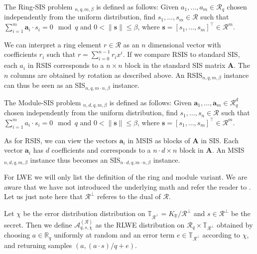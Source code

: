 
\begin{definition}
    The Ring-SIS problem $_{n, q, m, \beta}$ is defined as follows: Given $a_1, \ldots, a_m \in \mathcal{R}_q$ chosen independently from the uniform distribution, find $s_1, \ldots, s_m \in \mathcal{R}$ such that $\sum_{i=1}^m \mathbf{a}_i \cdot s_i = 0 \mod q$ and $0 < \| \mathbf{s}\| \leq \beta$, where $\mathbf{s} = \left[s_1, \ldots, s_m\right]^\intercal \in \mathcal{R}^m$.
\end{definition} %
We can interpret a ring element $r \in \mathcal{R}$ as an $n$ dimensional vector with coefficients $r_i$ such that $r = \sum_{i=0}^{n-1} r_i x^i$. If we compare RSIS to standard SIS, each $a_i$ in RSIS corresponds to a $n\times n$ block in the standard SIS matrix $\mathbf{A}$. The $n$ columns are obtained by rotation as described above. An RSIS$_{n, q, m, \beta}$ instance can thus be seen as an SIS$_{n, q, m \cdot n, \beta}$ instance.

\begin{definition}
    The Module-SIS problem $_{n, d, q, m, \beta}$ is defined as follows: Given  $\mathbf{a}_1, \ldots, \mathbf{a}_m \in \mathcal{R}_q^d$ chosen independently from the uniform distribution, find $s_1, \ldots, s_n \in \mathcal{R}$ such that $\sum_{i=1}^m a_i \cdot s_i = 0\mod q$ and $0 < \| \mathbf{s}\| \leq \beta$, where $\mathbf{s} = \left[s_1, \ldots, s_m\right]^\intercal \in \mathcal{R}^m$.
\end{definition} %
As for RSIS, we can view the vectors $\mathbf{a}_i$ in MSIS as blocks of $\mathbf{A}$ in SIS. Each vector $\mathbf{a}_i$ has $d$ coefficients and corresponds to a $n\cdot d \times n$ block in $\mathbf{A}$. An MSIS$_{n, d, q, m, \beta}$ instance thus becomes an SIS$_{n\cdot d, q, m \cdot n, \beta}$ instance.

For LWE we will only list the definition of the ring and module variant. We are aware that we have not introduced the underlying math and refer the reader to \cite{LS15}. Let us just note here that $\mathcal{R}^\perp$ referes to the dual of $\mathcal{R}$.
\begin{definition}
    Let $\chi$ be the error distribution distribution on $\mathbb{T}_{\mathcal{R}^\perp} = K_\mathbb{R} / \mathcal{R}^\perp$ and $s \in \mathcal{R}^\perp$ be the secret. Then we define $\mathcal{A}_{q, s, \chi}^{(\mathcal{R})}$ as the RLWE distribution on $\mathcal{R}_q \times \mathbb{T}_{\mathcal{R}^\perp}$ obtained by choosing $a \in \mathbb{R}_q$ uniformly at random and an error term $e \in \mathbb{T}_{\mathcal{R}^\perp}$ according to $\chi$, and returning samples $(a, (a \cdot s)/q + e)$.
\end{definition}

